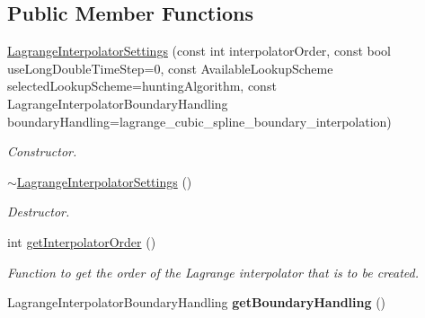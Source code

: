 \subsection*{Public Member Functions}
\begin{DoxyCompactItemize}
\item 
\hyperlink{classtudat_1_1interpolators_1_1LagrangeInterpolatorSettings_afc80111a5d232b1b24377ce25ca1122a}{Lagrange\+Interpolator\+Settings} (const int interpolator\+Order, const bool use\+Long\+Double\+Time\+Step=0, const Available\+Lookup\+Scheme selected\+Lookup\+Scheme=hunting\+Algorithm, const Lagrange\+Interpolator\+Boundary\+Handling boundary\+Handling=lagrange\+\_\+cubic\+\_\+spline\+\_\+boundary\+\_\+interpolation)
\begin{DoxyCompactList}\small\item\em Constructor. \end{DoxyCompactList}\item 
\hyperlink{classtudat_1_1interpolators_1_1LagrangeInterpolatorSettings_a9941e23b2273de2125c4eced955b9c5f}{$\sim$\+Lagrange\+Interpolator\+Settings} ()\hypertarget{classtudat_1_1interpolators_1_1LagrangeInterpolatorSettings_a9941e23b2273de2125c4eced955b9c5f}{}\label{classtudat_1_1interpolators_1_1LagrangeInterpolatorSettings_a9941e23b2273de2125c4eced955b9c5f}

\begin{DoxyCompactList}\small\item\em Destructor. \end{DoxyCompactList}\item 
int \hyperlink{classtudat_1_1interpolators_1_1LagrangeInterpolatorSettings_a89db0c98e62d77129bfacc93243e16e4}{get\+Interpolator\+Order} ()
\begin{DoxyCompactList}\small\item\em Function to get the order of the Lagrange interpolator that is to be created. \end{DoxyCompactList}\item 
Lagrange\+Interpolator\+Boundary\+Handling {\bfseries get\+Boundary\+Handling} ()\hypertarget{classtudat_1_1interpolators_1_1LagrangeInterpolatorSettings_abdbe5a7c22938e2d7cad5e9f62300ba3}{}\label{classtudat_1_1interpolators_1_1LagrangeInterpolatorSettings_abdbe5a7c22938e2d7cad5e9f62300ba3}

\end{DoxyCompactItemize}
